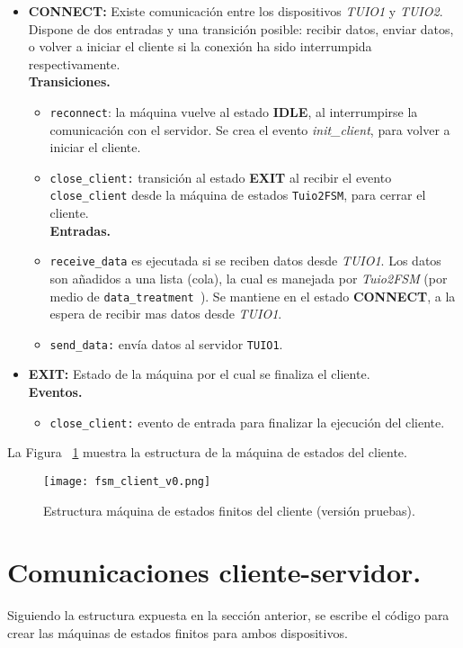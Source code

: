 \begin{itemize}
\item \textbf{CONNECT:} Existe comunicación entre los dispositivos \emph{TUIO1} y \emph{TUIO2}. 
Dispone de dos entradas y una transición posible: recibir datos, enviar datos, o volver a iniciar el cliente si la conexión ha sido interrumpida respectivamente.\\
\textbf{Transiciones.}
\begin{itemize}
\item \texttt{reconnect}: la máquina vuelve al estado \textbf{IDLE}, al interrumpirse la comunicación con el servidor. Se crea el evento \emph{init\_client}, para volver a iniciar el cliente.
\item \texttt{close\_client:} transición al estado \textbf{EXIT} al recibir el evento \texttt{close\_client} desde la máquina de estados \texttt{Tuio2FSM}, para cerrar el cliente.\\
\textbf{Entradas.}
\item \texttt{receive\_data} es ejecutada si se reciben datos desde \emph{TUIO1}. Los datos son añadidos a una lista (cola), la cual es manejada por \emph{Tuio2FSM} (por medio de \texttt{data\_treatment
}). Se mantiene en el estado \textbf{CONNECT}, a la espera de recibir mas datos desde \emph{TUIO1}.
\item \texttt{send\_data:} envía datos al servidor \texttt{TUIO1}.
\end{itemize}


\item \textbf{EXIT:} Estado de la máquina por el cual se finaliza el cliente.\\
\textbf{Eventos.}
\begin{itemize}
\item \texttt{close\_client:} evento de entrada para finalizar la ejecución del cliente.
\end{itemize}
\end{itemize}

La Figura ~\ref{fig:fsmclientv0} muestra la estructura de la máquina de estados del cliente.

\begin{figure}[!h]
\begin{center}
\texttt{[image: fsm\_client\_v0.png]}
\caption{Estructura máquina de estados finitos del cliente (versión pruebas).}
\label{fig:fsmclientv0}
\end{center}
\end{figure}

\section{Comunicaciones cliente-servidor.}
\label{sec:comunicaciones}
Siguiendo la estructura expuesta en la sección anterior, se escribe el código para crear las máquinas de estados finitos para ambos dispositivos.

